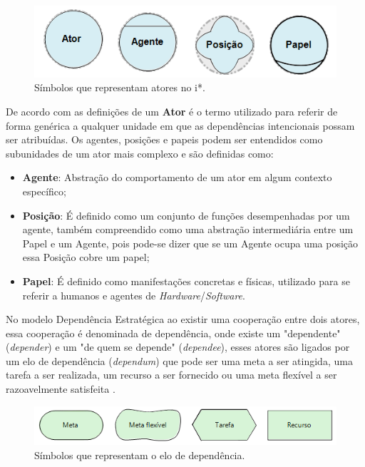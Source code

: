 \begin{figure}[h!]
	\centering
	\includegraphics[keepaspectratio=true,scale=1.0]{figuras/papeisIstar.PNG}
	\caption{Símbolos que representam atores no i*.}
	\label{atoresIstar}
\end{figure}

De acordo com as definições de \cite{istarwiki20} um  \textbf{Ator} é o termo utilizado para referir de forma genérica a qualquer unidade em que as dependências intencionais possam ser atribuídas. Os agentes, posições e papeis podem ser entendidos como subunidades de um ator mais complexo e são definidas como: 

\begin{itemize}
	\item \textbf{Agente}: Abstração do comportamento de um ator em algum contexto específico; 
	\item \textbf{Posição}: É definido como um conjunto de funções desempenhadas por um agente, também compreendido como uma abstração intermediária entre um Papel e um Agente, pois pode-se dizer que se um Agente ocupa uma posição essa Posição cobre um papel;
	\item \textbf{Papel}: É definido como manifestações concretas e físicas, utilizado para se referir a humanos e agentes de \textit{Hardware}/\textit{Software}.
\end{itemize} 

No modelo Dependência Estratégica ao existir uma cooperação entre dois atores, essa cooperação é denominada de dependência, onde existe um "dependente" (\textit{depender}) e um "de quem se depende" (\textit{dependee}), esses atores são ligados por um elo de dependência (\textit{dependum}) que pode ser uma meta a ser atingida, uma tarefa a ser realizada, um recurso a ser fornecido ou uma meta flexível a ser razoavelmente satisfeita \cite{napolitano2009estrategia}. 

\begin{figure}[h!]
	\centering
	\includegraphics[keepaspectratio=true,scale=1.0]{figuras/TiposDeContribuicao.png}
	\caption{Símbolos que representam o elo de dependência.}
	\label{dependenciaIstar}
\end{figure} 

